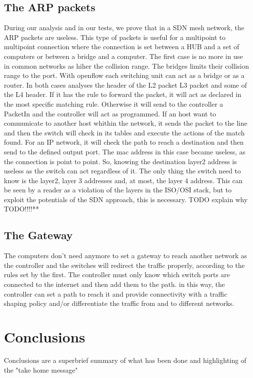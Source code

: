 \documentclass[conference,10pt]{IEEEtran}
\begin{document}
\subsection{The ARP packets}
During our analysis and in our tests, we prove that in a SDN mesh network, the ARP packets are useless.
This type of packets is useful for a multipoint to multipoint connection where the connection is set between a
HUB and a set of computers or between a bridge and a computer. The first case is no more in use in common networks as
hiher the collision range. The bridges limits their collision range to the port. With openflow each switching unit can
act as a bridge or as a router. In both cases analyses the header of the L2 packet L3 packet and some of the L4 header.
If it has the rule to forward the packet, it will act as declared in the most specific matching rule. Otherwise it will
send to the controller a PacketIn and the controller will act as programmed. If an host want to communicate to another host whithin
the network, it sends the packet to the line and then the switch will check in its tables and execute the actions of the match found.
For an IP network, it will check the path to reach a destination and then send to the defined output port. The mac address in this case
became useless, as the connection is point to point. So, knowing the destination layer2 address is useless as the switch can act
regardless of it. The only thing the switch need to know is the layer2, layer 3 addresses and, at most, the layer 4 address.
This can be seen by a reader as a violation of the layers in the ISO/OSI stack, but to exploit the potentials of the SDN approach,
this is necessary. TODO explain why TODO!!!!**

\subsection{The Gateway}
The computers don't need anymore to set a gateway to reach another network as the controller and the switches will redirect the traffic
properly, according to the rules set by the first. The controller must only know which switch ports are connected to the
internet and then add them to the path. in this way, the controller can set a path to reach it and provide connectivity with
a traffic shaping policy and/or differentiate the traffic from and to different networks. 


\section{Conclusions}\label{sec:conclusion}
Conclusions are a superbrief summary of what has been done and highlighting of the "take home message"
\end{document}

